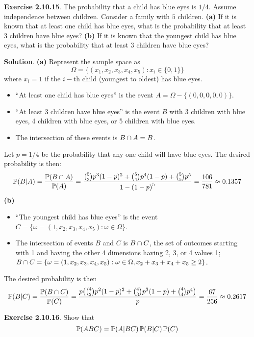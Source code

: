 \textbf{Exercise 2.10.15}. The probability that a child has blue eyes is $1/4$. Assume independence between children. Consider a family with $5$ children.
\textbf{(a)} If it is known that at least one child has blue eyes, what is the probability that at least $3$ children have blue eyes?
\textbf{(b)} If it is known that the youngest child has blue eyes, what is the probability that at least $3$ children have blue eyes?

\textbf{Solution}.
\textbf{(a)} Represent the sample space as
\[
\Omega = \{ (x_{1}, x_{2}, x_{3}, x_{4}, x_{5}) : x_{i} \in \{ 0, 1 \} \} 
\]
where \(x_{i} = 1\) if the \(i-\)th child (youngest to oldest) has blue
eyes.
\begin{itemize}[tightlist]
\item
  ``At least one child has blue eyes'' is the event
  \(A = \Omega - \{ (0, 0, 0, 0, 0) \}\).
\item
  ``At least 3 children have blue eyes'' is the event \(B\) with 3
  children with blue eyes, 4 children with blue eyes, or 5 children with
  blue eyes.
\item
  The intersection of these events is \(B \cap A = B\).
\end{itemize}
Let \(p = 1/4\) be the probability that any one child will have blue eyes.
The desired probability is then:
\[
\PROB(B | A) = \frac{\PROB(B \inter A)}{\PROB(A)} = \frac{
\binom{5}{3} p^{3} (1 - p)^{2} + \binom{5}{4} p^{4} (1 - p) + \binom{5}{5} p^{5}
}{1 - \left(1 - p \right)^{5}} = \frac{106}{781} \approx 0.1357
\]
\textbf{(b)}
\begin{itemize}[tightlist]
\item
  ``The youngest child has blue eyes'' is the event
  \(C = \{ \omega = (1, x_{2}, x_{3}, x_{4}, x_{5}) : \omega \in \Omega \}\).
\item
  The intersection of events \(B\) and \(C\) is \(B \cap C\), the set of
  outcomes starting with 1 and having the other 4 dimensions having 2,
  3, or 4 values 1;
  \(B \cap C = \{ \omega = (1, x_{2}, x_{3}, x_{4}, x_{5}) : \omega \in \Omega, x_{2} + x_{3} + x_{4} + x_{5} \geq 2 \}\).
\end{itemize}
The desired probability is then
\[
\PROB(B | C) = \frac{\PROB(B \inter C)}{\PROB(C)} = \frac{p \left(\binom{4}{2} p^{2} (1-p)^{2} + \binom{4}{3} p^{3} (1 - p) + \binom{4}{4} p^{4} \right)}{ p } = \frac{67}{256} \approx 0.2617
\]

\textbf{Exercise 2.10.16}. Show that
\[
 \operatorname{\mathbb{P}}(ABC) = \operatorname{\mathbb{P}}(A | BC) \operatorname{\mathbb{P}}(B | C) \operatorname{\mathbb{P}}(C)
\]


